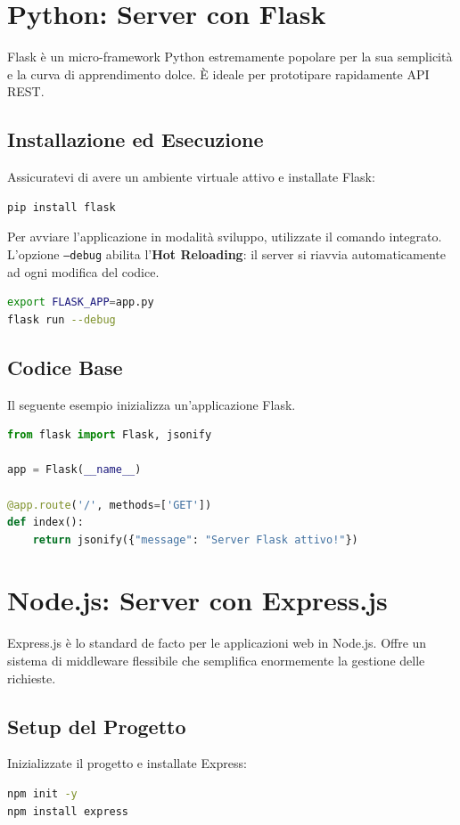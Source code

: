 \documentclass[11pt,a4paper]{report}
\begin{document}
\section{Python: Server con Flask}
Flask è un micro-framework Python estremamente popolare per la sua semplicità e la curva di apprendimento dolce. È ideale per prototipare rapidamente API REST.

\subsection{Installazione ed Esecuzione}
Assicuratevi di avere un ambiente virtuale attivo e installate Flask:
\begin{lstlisting}[language=bash]
pip install flask
\end{lstlisting}

Per avviare l'applicazione in modalità sviluppo, utilizzate il comando integrato. L'opzione \texttt{--debug} abilita l'\textbf{Hot Reloading}: il server si riavvia automaticamente ad ogni modifica del codice.
\begin{lstlisting}[language=bash]
export FLASK_APP=app.py
flask run --debug
\end{lstlisting}

\subsection{Codice Base}
Il seguente esempio inizializza un'applicazione Flask.

\begin{lstlisting}[language=python, caption=app.py (Flask)]
from flask import Flask, jsonify

app = Flask(__name__)

@app.route('/', methods=['GET'])
def index():
    return jsonify({"message": "Server Flask attivo!"})
\end{lstlisting}

\section{Node.js: Server con Express.js}
Express.js è lo standard de facto per le applicazioni web in Node.js. Offre un sistema di middleware flessibile che semplifica enormemente la gestione delle richieste.

\subsection{Setup del Progetto}
Inizializzate il progetto e installate Express:
\begin{lstlisting}[language=bash]
npm init -y
npm install express
\end{lstlisting}
\end{document}
